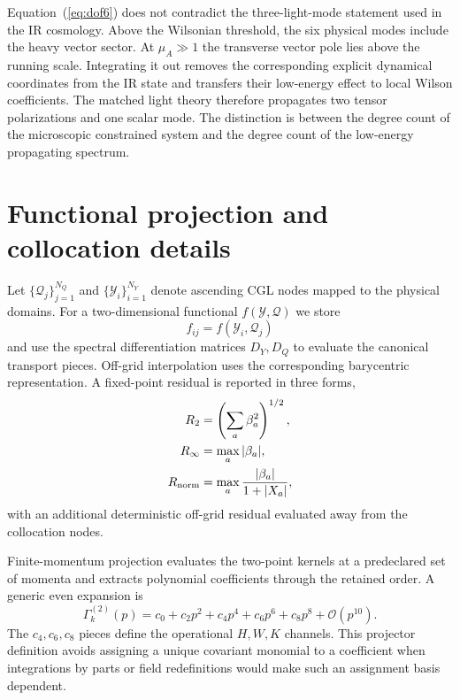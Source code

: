 \documentclass[12pt]{iopart}
\newcommand{\cO}{\mathcal O}
\newcommand{\Q}{\mathcal Q}
\newcommand{\Y}{\mathcal Y}
\begin{document}
Equation~(\ref{eq:dof6}) does not contradict the three-light-mode statement used in the IR cosmology.  Above the Wilsonian threshold, the six physical modes include the heavy vector sector.  At $\mu_A\gg1$ the transverse vector pole lies above the running scale.  Integrating it out removes the corresponding explicit dynamical coordinates from the IR state and transfers their low-energy effect to local Wilson coefficients.  The matched light theory therefore propagates two tensor polarizations and one scalar mode.  The distinction is between the degree count of the microscopic constrained system and the degree count of the low-energy propagating spectrum.

\section{Functional projection and collocation details}
\label{app:projection}

Let $\{\Q_j\}_{j=1}^{N_Q}$ and $\{\Y_i\}_{i=1}^{N_Y}$ denote ascending CGL nodes mapped to the physical domains.  For a two-dimensional functional $f(\Y,\Q)$ we store
\begin{equation}
f_{ij}=f(\Y_i,\Q_j)
\end{equation}
and use the spectral differentiation matrices $D_Y,D_Q$ to evaluate the canonical transport pieces.  Off-grid interpolation uses the corresponding barycentric representation.  A fixed-point residual is reported in three forms,
\begin{align}
R_2&=\left(\sum_a\beta_a^2\right)^{1/2},\\
R_\infty&=\max_a|\beta_a|,\\
R_{\rm norm}&=\max_a\frac{|\beta_a|}{1+|X_a|},
\end{align}
with an additional deterministic off-grid residual evaluated away from the collocation nodes.

Finite-momentum projection evaluates the two-point kernels at a predeclared set of momenta and extracts polynomial coefficients through the retained order.  A generic even expansion is
\begin{equation}
\Gamma_k^{(2)}(p)=c_0+c_2p^2+c_4p^4+c_6p^6+c_8p^8+\cO(p^{10}).
\end{equation}
The $c_4,c_6,c_8$ pieces define the operational $H,W,K$ channels.  This projector definition avoids assigning a unique covariant monomial to a coefficient when integrations by parts or field redefinitions would make such an assignment basis dependent.
\end{document}
